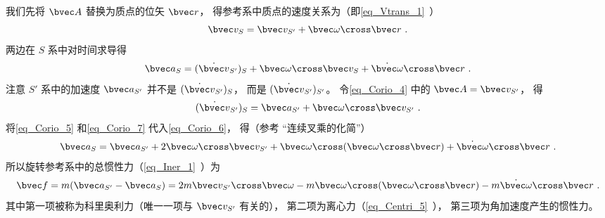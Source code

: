 我们先将 $\bvec A$ 替换为质点的位矢 $\bvec r$， 得参考系中质点的速度关系为（即\autoref{eq_Vtrans_1}~）
\begin{equation}\label{eq_Corio_5}
\bvec v_{S} = \bvec v_{S'} + \bvec\omega\cross\bvec r~.
\end{equation}
两边在 $S$ 系中对时间求导得
\begin{equation}\label{eq_Corio_6}
\bvec a_{S} = (\dot{\bvec v}_{S'})_{S} + \bvec\omega\cross\bvec v_{S} + \dot{\bvec\omega} \cross\bvec r~.
\end{equation}
注意 $S'$ 系中的加速度 $\bvec a_{S'}$ 并不是 $(\dot{\bvec v}_{S'})_{S}$， 而是 $(\dot{\bvec v}_{S'})_{S'}$。 令\autoref{eq_Corio_4} 中的 $\bvec A = \bvec v_{S'}$， 得
\begin{equation}\label{eq_Corio_7}
(\dot{\bvec v}_{S'})_{S} = \bvec a_{S'} + \bvec\omega\cross\bvec v_{S'}~.
\end{equation}
将\autoref{eq_Corio_5} 和\autoref{eq_Corio_7} 代入\autoref{eq_Corio_6}， 得（参考 “连续叉乘的化简”）
\begin{equation}
\bvec a_{S} = \bvec a_{S'} + 2\bvec\omega\cross\bvec v_{S'} + \bvec\omega\cross(\bvec\omega\cross\bvec r) + \dot{\bvec\omega} \cross\bvec r~.
\end{equation}
所以旋转参考系中的总惯性力（\autoref{eq_Iner_1}~）为
\begin{equation}\label{eq_Corio_1}
\bvec f = m(\bvec a_{S'} - \bvec a_{S}) = 2m\bvec v_{S'}\cross \bvec\omega  -m\bvec\omega\cross(\bvec\omega\cross\bvec r) - m \dot{\bvec\omega} \cross\bvec r~.
\end{equation}
其中第一项被称为科里奥利力（唯一一项与 $\bvec v_{S'}$ 有关的）， 第二项为离心力（\autoref{eq_Centri_5}~）， 第三项为角加速度产生的惯性力。
